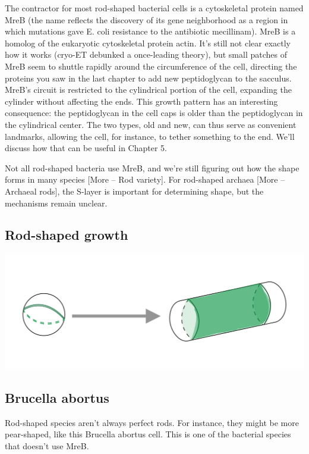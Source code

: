 \documentclass[]{tufte-book}
\begin{document}
The contractor for most rod-shaped bacterial cells is a cytoskeletal
protein named MreB (the name reflects the discovery of its gene
neighborhood as a region in which mutations gave E. coli resistance to
the antibiotic mecillinam). MreB is a homolog of the eukaryotic
cytoskeletal protein actin. It's still not clear exactly how it works
(cryo-ET debunked a once-leading theory), but small patches of MreB seem
to shuttle rapidly around the circumference of the cell, directing the
proteins you saw in the last chapter to add new peptidoglycan to the
sacculus. MreB's circuit is restricted to the cylindrical portion of the
cell, expanding the cylinder without affecting the ends. This growth
pattern has an interesting consequence: the peptidoglycan in the cell
caps is older than the peptidoglycan in the cylindrical center. The two
types, old and new, can thus serve as convenient landmarks, allowing the
cell, for instance, to tether something to the end. We'll discuss how
that can be useful in Chapter 5.

Not all rod-shaped bacteria use MreB, and we're still figuring out how
the shape forms in many species {[}More -- Rod variety{]}. For
rod-shaped archaea {[}More -- Archaeal rods{]}, the S-layer is important
for determining shape, but the mechanisms remain unclear.

\hypertarget{Rod-shaped_growth}{\subsection{Rod-shaped
growth}\label{Rod-shaped_growth}}

\includegraphics{img/03_schematic/3_2_1_RodGrowth}

\subsection{Brucella abortus}\label{Rod_variety}

Rod-shaped species aren't always perfect rods. For instance, they might
be more pear-shaped, like this Brucella abortus cell. This is one of the
bacterial species that doesn't use MreB.
\end{document}
